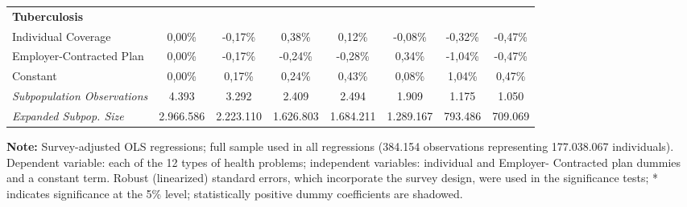 \documentclass{article}
\begin{document}
\begin{table*}
{\begin{tabular}{l*{7}{c}}
\midrule
\textbf{Tuberculosis} & & & & & & & \\

Individual Coverage & 0,00\% & -0,17\%\sym{*}  & 0,38\% & 0,12\% & -0,08\% & -0,32\% & -0,47\% \\
Employer-Contracted Plan& 0,00\% & -0,17\%\sym{*}  & -0,24\%\sym{*}  & -0,28\% & 0,34\% & -1,04\%\sym{*}  & -0,47\% \\
Constant            & 0,00\% & 0,17\%\sym{*}  & 0,24\%\sym{*}  & 0,43\%\sym{**} & 0,08\% & 1,04\%\sym{*}  & 0,47\% \\


\midrule

\textit{Subpopulation Observations} 	&   4.393         & 3.292        & 2.409        & 2.494         & 1.909       & 1.175      & 1.050         \\
\textit{Expanded Subpop. Size} 		&   2.966.586 & 2.223.110 & 1.626.803 & 1.684.211 & 1.289.167 & 793.486 & 709.069      \\

	\hline \hline

\end{tabular}}

\justify \small {} \textbf{Note:} Survey-adjusted OLS regressions; full sample used in all regressions (384.154 observations representing 177.038.067
individuals). Dependent variable: each of the 12 types of health problems; independent variables: individual and Employer-
Contracted plan dummies and a constant term. Robust (linearized) standard errors, which incorporate the survey design, were
used in the significance tests; * indicates significance at the 5\% level; statistically positive dummy coefficients are shadowed.

\end{table*}



















\newpage
\end{document}
